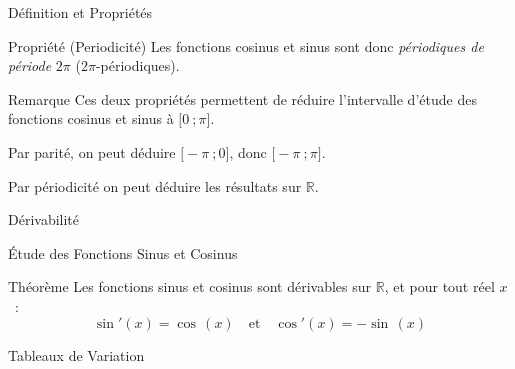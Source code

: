 \documentclass{cours}
\begin{document}
\begin{Gpartie}{Définition et Propriétés}
\begin{Spartie}{Propriété (Periodicité)}
            Les fonctions cosinus et sinus sont donc \emph{périodiques de période} $2\pi$ ($2\pi$-périodiques).
        \end{Spartie}
        \begin{Spartie}{Remarque} 
            Ces deux propriétés permettent de réduire l'intervalle d'étude des fonctions cosinus et sinus à $\big[0~;\pi\big]$.

            Par parité, on peut déduire $\big[-\pi~;0\big]$, donc $\big[-\pi~;\pi\big]$.
            
            Par périodicité on peut déduire les résultats sur $\mathbb{R}$.
        \end{Spartie}
    \end{Gpartie}
    \begin{Gpartie}{Dérivabilité} 
        \begin{Spartie}{Étude des Fonctions Sinus et Cosinus} 
            \begin{SSpartie}{Théorème} 
                Les fonctions sinus et cosinus sont dérivables sur $\mathbb{R}$, et pour tout réel $x$~: \[\boxed{\sin'(x)=\cos\,(x)}\quad\text{et}\quad\boxed{\cos'(x)=-\sin\,(x)}\]
            \end{SSpartie}
            \begin{SSpartie}{Tableaux de Variation} 
                \begin{center}
                    \parbox{\linewidth}{}
                \end{center}
            \end{SSpartie}
            \pagebreak

\end{Spartie}
\end{Gpartie}
\end{document}
